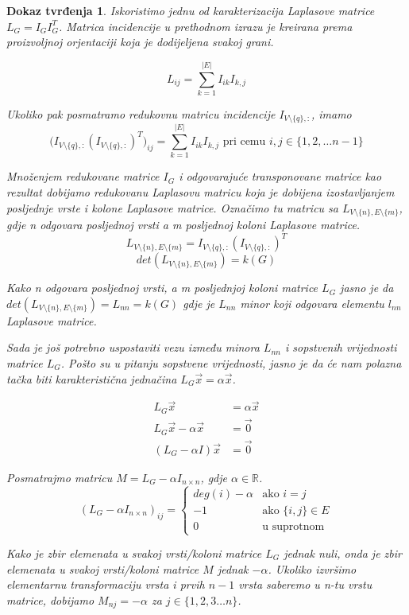 \documentclass[11pt]{article}
\newtheorem*{custom_proof}{Dokaz tvrđenja}
\begin{document}
\begin{custom_proof}
		Iskoristimo jednu od karakterizacija Laplasove matrice $L_G = I_G I_G^T$.
		Matrica incidencije u prethodnom izrazu je kreirana prema proizvoljnoj orjentaciji koja je dodijeljena svakoj grani.
		
		\[
			L_{ij} = \sum_{k=1}^{|E|} I_{ik}I_{k,j}
		\]

		Ukoliko pak posmatramo redukovnu matricu incidencije $I_{V \setminus \{q\},:}$, imamo
		\[
		\big(I_{V \setminus \{q\},:}(I_{V \setminus \{q\},:})^T\big)_{ij} = \sum_{k=1}^{|E|} I_{ik}I_{k,j} \text{ pri cemu } i,j \in \{1,2, \dots n-1\}
		\]
	
		Množenjem redukovane matrice $I_G$ i odgovarajuće transponovane matrice kao rezultat dobijamo redukovanu Laplasovu matricu koja je dobijena izostavljanjem posljednje vrste i kolone Laplasove matrice.
		Označimo tu matricu sa $L_{V \setminus \{n\}, E \setminus \{m\}}$, gdje n odgovara posljednoj vrsti a m posljednoj koloni Laplasove matrice.
		\[
			L_{V \setminus \{n\}, E \setminus \{m\}} = I_{V \setminus \{q\},:}(I_{V \setminus \{q\},:})^T
		\]
		\[
			det(L_{V \setminus \{n\}, E \setminus \{m\}}) = k(G)
		\]

		Kako n odgovara posljednoj vrsti, a m posljednjoj koloni matrice $L_G$ jasno je da $det(L_{V \setminus \{n\}, E \setminus \{m\}}) = L_{nn} = k(G)$ gdje je $L_{nn}$ minor koji odgovara elementu $l_{nn}$ Laplasove matrice.
	
	 	Sada je još potrebno uspostaviti vezu između minora $L_{nn}$ i sopstvenih vrijednosti matrice $L_G$.
		Pošto su u pitanju sopstvene vrijednosti, jasno je da će nam polazna tačka biti karakteristična jednačina $L_G \vec{x} = \alpha \vec{x}$.

		\[
			\begin{split}
				L_G \vec{x} &= \alpha \vec{x} \\
				L_G \vec{x} - \alpha \vec{x} &= \vec{0}  \\
				(L_G - \alpha I) \vec{x} &= \vec{0}  
			\end{split}
		\]
	
		Posmatrajmo matricu $ M = L_G - \alpha I_{n \times n}$, gdje $\alpha \in \mathbb{R}$.
		\[
				 (L_G - \alpha I_{n \times n})_{ij} =
				 \begin{cases}
				 deg(i) - \alpha  & \text{ako } i = j \\
				 -1 & \text{ako } \{i,j\} \in E \\ 
				 0  & \text{u suprotnom}
				 \end{cases}
		\]

		Kako je zbir elemenata u svakoj vrsti/koloni matrice $L_G$ jednak nuli, onda je zbir elemenata u svakoj vrsti/koloni matrice $M$ jednak $-\alpha$.
		Ukoliko izvršimo elementarnu transformaciju vrsta i prvih $n-1$ vrsta saberemo u n-tu vrstu matrice, dobijamo  $M_{nj} = -\alpha$ za $ j \in \{1,2,3 \dots n\}$.
		

\end{custom_proof}
\end{document}
